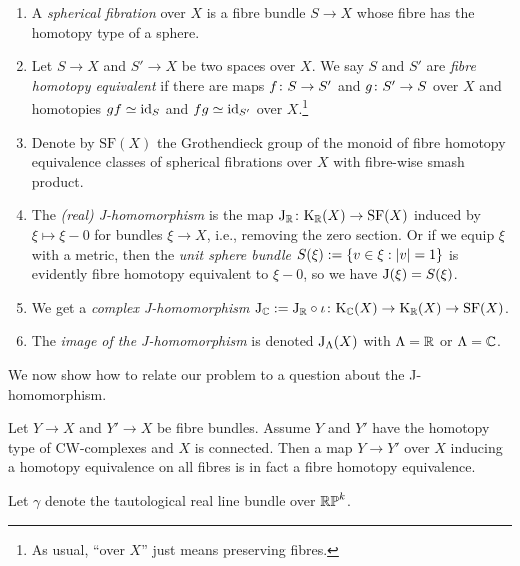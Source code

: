 \newcommand{\SF}{\mathrm{SF}}
\begin{definitions}
  \label{J-dfns}
  \begin{enumerate}[leftmargin=*]
  \item A \emph{spherical fibration} over $X$ is a fibre bundle $S \to
    X$ whose fibre has the homotopy type of a sphere.
  \item Let $S \to X$ and $S' \to X$ be two spaces over $X$. We say
    $S$ and $S'$ are \emph{fibre homotopy equivalent} if there are
    maps $f \colon S \to S'$ and $g \colon S' \to S$ over $X$ and homotopies
    $gf \simeq \mathrm{id}_S$ and $fg \simeq \mathrm{id}_{S'}$ over $X$.\footnote{As
      usual, ``over $X$'' just means preserving fibres.}
  \item Denote by $\SF(X)$ the Grothendieck group of the monoid of
    fibre homotopy equivalence classes of spherical fibrations over
    $X$ with fibre-wise smash product.
  \item The \emph{(real) J-homomorphism} is the map $\J_\R \c \K_\R(X)
    \to \SF(X)$ induced by $\xi \mapsto \xi-0$ for bundles $\xi \to
    X$, i.e., removing the zero section. Or if we equip $\xi$ with a
    metric, then the \emph{unit sphere bundle} $S(\xi) \mathrel{:=} \{v \in \xi
    : |v| = 1\}$ is evidently fibre homotopy equivalent to $\xi-0$, so
    we have $\mathrm{J}(\xi) = S(\xi)$.
  \item We get a \emph{complex J-homomorphism} $\J_\C \ce \J_\R \circ
    \iota \c \K_\C(X) \to \K_\R(X) \to \SF(X)$.
  \item The \emph{image of the J-homomorphism} is denoted
    $\mathrm{J}_\Lambda(X)$ with $\Lambda = \mathbb{R}$ or $\Lambda = \mathbb{C}$.
  \end{enumerate}
\end{definitions}

We now show how to relate our problem to a question about the
J-homomorphism.

\begin{lemma}
  \label{dold-fibre}
  Let $Y \to X$ and $Y' \to X$ be fibre bundles. Assume $Y$ and $Y'$
  have the homotopy type of CW-complexes and $X$ is connected. Then a
  map $Y \to Y'$ over $X$ inducing a homotopy equivalence on all
  fibres is in fact a fibre homotopy equivalence.
\end{lemma}

\begin{notation}
  \label{bundle-notation}
  Let $\gamma$ denote the tautological real line bundle over $\mathbb{RP}^k$.
\end{notation}

